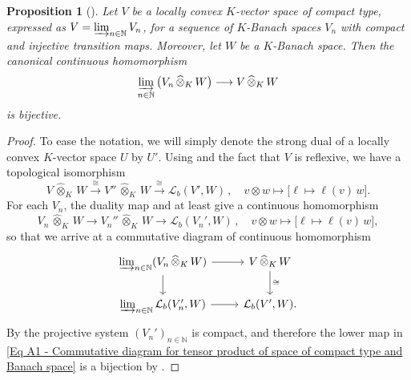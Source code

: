 \documentclass[a4paper, reqno, 10pt]{amsart}
\newtheorem{proposition}[theorem]{Proposition}
\theoremstyle{definition}
\numberwithin{equation}{section}
\newcommand{\cotimes}[1]{{\,\widehat{\otimes}_{#1}\,}}
\newcommand{\lra}{\longrightarrow}
\newcommand{\lto}{\longmapsto}
\newcommand{\mto}{\mapsto}
\newcommand{\BN}{{\mathbb {N}}}
\newcommand{\CL}{{\mathcal {L}}}
\begin{document}
\begin{proposition}[{\cite[Prop.\ 1.5]{SchneiderTeitelbaum02LocAnDistApplToGL2}}]\label{Prop A1 - Continuous bijection for tensor product of space of compact type and Banach space}
Let $V$ be a locally convex $K$-vector space of compact type, expressed as $V = \varinjlim_{n \in \BN} V_n$, for a sequence of $K$-Banach spaces $V_n$ with compact and injective transition maps.
Moreover, let $W$ be a $K$-Banach space.
Then the canonical continuous homomorphism
\begin{equation*}
	\varinjlim_{n\in \BN} \big( V_n \cotimes{K} W \big) \lra V \cotimes{K} W
\end{equation*}
is bijective.
\end{proposition}
\begin{proof}
To ease the notation, we will simply denote the strong dual of a locally convex $K$-vector space $U$ by $U'$.
Using \cite[Cor.\ 18.8]{Schneider02NonArchFunctAna} and the fact that $V$ is reflexive, we have a topological isomorphism
\begin{equation*}
	V \cotimes{K} W \overset{\cong}{\lra} V'' \cotimes{K} W \overset{\cong}{\lra} \CL_b (V', W) \,,\quad v\otimes w \lto \big[\ell \mto \ell(v)\, w\big] .
\end{equation*}
For each $V_n$, the duality map and \cite[Lemma 18.1]{Schneider02NonArchFunctAna} at least give a continuous homomorphism
\begin{equation*}
	V_n \cotimes{K} W \lra V_n'' \cotimes{K} W \lra \CL_b (V_n', W) \,,\quad v \otimes w \lto \big[\ell \mto \ell(v)\, w\big] ,
\end{equation*}
so that we arrive at a commutative diagram of continuous homomorphism
\begin{equation}\label{Eq A1 - Commutative diagram for tensor product of space of compact type and Banach space}
	\begin{tikzcd}
		\varinjlim_{n \in \BN} (V_n \cotimes{K} W) \ar[r] \ar[d] &V \cotimes{K} W  \ar[d, "\cong"] \\
		\varinjlim_{n \in \BN} \CL_b (V_n', W) \ar[r] &\CL_b(V', W).
	\end{tikzcd}		
\end{equation}
By \cite[Lemma 16.4 (ii)]{Schneider02NonArchFunctAna} the projective system $(V_n')_{n\in \BN}$ is compact, and therefore the lower map in \eqref{Eq A1 - Commutative diagram for tensor product of space of compact type and Banach space} is a bijection by .



\end{proof}
\end{document}
